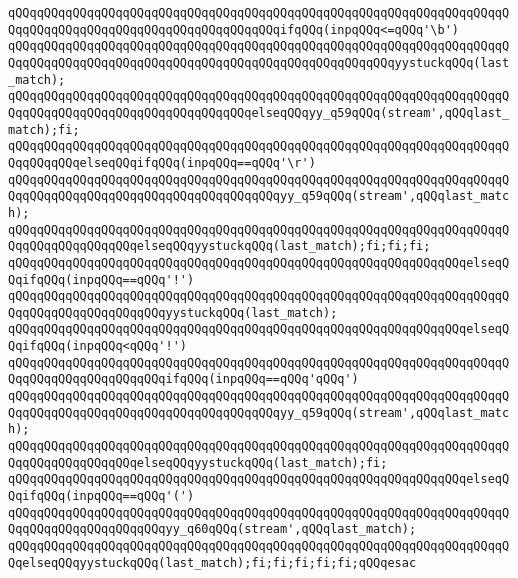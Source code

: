 \verb|qQQqqQQqqQQqqQQqqQQqqQQqqQQqqQQqqQQqqQQqqQQqqQQqqQQqqQQqqQQqqQQqqQQqqQQqqQQqqQQqqQQqqQQqqQQqqQQqqQQqqQQqqQQqifqQQq(inpqQQq<=qQQq'\b')|\newline
\verb|qQQqqQQqqQQqqQQqqQQqqQQqqQQqqQQqqQQqqQQqqQQqqQQqqQQqqQQqqQQqqQQqqQQqqQQqqQQqqQQqqQQqqQQqqQQqqQQqqQQqqQQqqQQqqQQqqQQqqQQqqQQqyystuckqQQq(last_match);|\newline
\verb|qQQqqQQqqQQqqQQqqQQqqQQqqQQqqQQqqQQqqQQqqQQqqQQqqQQqqQQqqQQqqQQqqQQqqQQqqQQqqQQqqQQqqQQqqQQqqQQqqQQqqQQqelseqQQqyy_q59qQQq(stream',qQQqlast_match);fi;|\newline
\verb|qQQqqQQqqQQqqQQqqQQqqQQqqQQqqQQqqQQqqQQqqQQqqQQqqQQqqQQqqQQqqQQqqQQqqQQqqQQqqQQqelseqQQqifqQQq(inpqQQq==qQQq'\r')|\newline
\verb|qQQqqQQqqQQqqQQqqQQqqQQqqQQqqQQqqQQqqQQqqQQqqQQqqQQqqQQqqQQqqQQqqQQqqQQqqQQqqQQqqQQqqQQqqQQqqQQqqQQqqQQqqQQqyy_q59qQQq(stream',qQQqlast_match);|\newline
\verb|qQQqqQQqqQQqqQQqqQQqqQQqqQQqqQQqqQQqqQQqqQQqqQQqqQQqqQQqqQQqqQQqqQQqqQQqqQQqqQQqqQQqqQQqelseqQQqyystuckqQQq(last_match);fi;fi;fi;|\newline
\verb|qQQqqQQqqQQqqQQqqQQqqQQqqQQqqQQqqQQqqQQqqQQqqQQqqQQqqQQqqQQqqQQqelseqQQqifqQQq(inpqQQq==qQQq'!')|\newline
\verb|qQQqqQQqqQQqqQQqqQQqqQQqqQQqqQQqqQQqqQQqqQQqqQQqqQQqqQQqqQQqqQQqqQQqqQQqqQQqqQQqqQQqqQQqqQQqyystuckqQQq(last_match);|\newline
\verb|qQQqqQQqqQQqqQQqqQQqqQQqqQQqqQQqqQQqqQQqqQQqqQQqqQQqqQQqqQQqqQQqelseqQQqifqQQq(inpqQQq<qQQq'!')|\newline
\verb|qQQqqQQqqQQqqQQqqQQqqQQqqQQqqQQqqQQqqQQqqQQqqQQqqQQqqQQqqQQqqQQqqQQqqQQqqQQqqQQqqQQqqQQqqQQqifqQQq(inpqQQq==qQQq'qQQq')|\newline
\verb|qQQqqQQqqQQqqQQqqQQqqQQqqQQqqQQqqQQqqQQqqQQqqQQqqQQqqQQqqQQqqQQqqQQqqQQqqQQqqQQqqQQqqQQqqQQqqQQqqQQqqQQqqQQqyy_q59qQQq(stream',qQQqlast_match);|\newline
\verb|qQQqqQQqqQQqqQQqqQQqqQQqqQQqqQQqqQQqqQQqqQQqqQQqqQQqqQQqqQQqqQQqqQQqqQQqqQQqqQQqqQQqqQQqelseqQQqyystuckqQQq(last_match);fi;|\newline
\verb|qQQqqQQqqQQqqQQqqQQqqQQqqQQqqQQqqQQqqQQqqQQqqQQqqQQqqQQqqQQqqQQqelseqQQqifqQQq(inpqQQq==qQQq'(')|\newline
\verb|qQQqqQQqqQQqqQQqqQQqqQQqqQQqqQQqqQQqqQQqqQQqqQQqqQQqqQQqqQQqqQQqqQQqqQQqqQQqqQQqqQQqqQQqqQQqyy_q60qQQq(stream',qQQqlast_match);|\newline
\verb|qQQqqQQqqQQqqQQqqQQqqQQqqQQqqQQqqQQqqQQqqQQqqQQqqQQqqQQqqQQqqQQqqQQqqQQqelseqQQqyystuckqQQq(last_match);fi;fi;fi;fi;fi;qQQqesac|\newline

